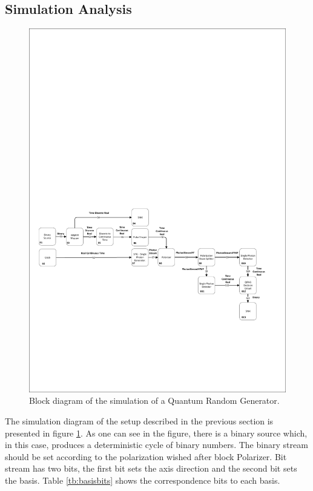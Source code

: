 \subsection{Simulation Analysis}

\begin{figure}[h]
    \centering
        \includegraphics[clip, trim=0.5cm 5cm 0.5cm 14cm, width=1.00\textwidth]{./sdf/qrng/figures_raw/Simulation_qrng.pdf}
    \caption{Block diagram of the simulation of a Quantum Random Generator.}\label{sim_qrng}
\end{figure}

The simulation diagram of the setup described in the previous section is presented in figure \ref{sim_qrng}. As one can see in the figure, there is a binary source which, in this case, produces a deterministic cycle of binary numbers. The binary stream should be set according to the polarization wished after block Polarizer. Bit stream has two bits, the first bit sets the axis direction and the second bit sets the basis. Table \ref{tb:basisbits} shows the correspondence bits to each basis.

